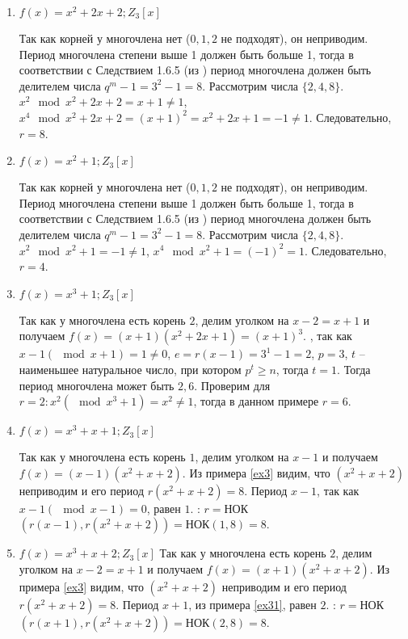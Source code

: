 \documentclass[utf8x, 14pt]{G7-32} %
\begin{document}
\begin{enumerate}
    \item $f(x)=x^2+2x+2; Z_3[x]$
    
    Так как корней у многочлена нет ($0,1,2$ не подходят), он неприводим. Период многочлена степени выше 1 должен быть больше 1, тогда в соответствии с Следствием 1.6.5 (из \cite{hse:Teoria_Gener}) период многочлена должен быть делителем числа $q^m -1 = 3^2 -1 = 8$. Рассмотрим числа $\{2, 4, 8\}$. $x^2 \mod x^2 + 2x +2 = x +1 \neq 1$,  $x^4 \mod x^2 + 2x +2 = (x +1)^2 = x^2 + 2x + 1 = - 1 \neq 1$. Следовательно, $r=8$.

    \item $f(x)=x^2+1; Z_3[x]$
    
    Так как корней у многочлена нет ($0,1,2$ не подходят), он неприводим. Период многочлена степени выше 1 должен быть больше 1, тогда в соответствии с Следствием 1.6.5 (из \cite{hse:Teoria_Gener}) период многочлена должен быть делителем числа $q^m -1 = 3^2 -1 = 8$. Рассмотрим числа $\{2, 4, 8\}$. $x^2 \mod x^2 + 1 = -1 \neq 1$,  $x^4 \mod x^2 + 1 = (-1)^2 = 1$. Следовательно, $r=4$.

    \item $f(x)=x^3+1; Z_3[x]$
    
    Так как у многочлена есть корень $2$, делим уголком на $x-2 = x+1$ и получаем $f(x) = (x+1) (x^2 + 2x +1) = (x+1)^3$. , так как $x - 1 (\mod{x + 1}) = 1 \neq 0$, $e = r(x-1) = 3^1 - 1 = 2$, $p = 3$, $t$ – наименьшее натуральное число, при котором $p^t\geq n$, тогда $t = 1$. Тогда период многочлена может быть ${2, 6}$. Проверим для $r = 2: x^2 (\mod x^3 + 1) = x^2 \neq 1$, тогда в данном примере $r = 6$.

    \item $f(x)=x^3+x+1; Z_3[x]$
    
    Так как у многочлена есть корень $1$, делим уголком на $x-1$ и получаем $f(x) = (x-1) (x^2 + x +2)$. Из примера \ref{ex3} видим, что $(x^2 + x +2)$ неприводим и его период $r(x^2 + x +2) = 8$. Период $x -1$, так как $x -1 (\mod{x - 1}) = 0$, равен $1$. : $r =$НОК$(r(x-1), r(x^2 + x +2)) = $НОК$(1, 8) = 8$.
    

    \item $f(x)=x^3+x+2; Z_3[x]$
    Так как у многочлена есть корень $2$, делим уголком на $x-2 = x+1$ и получаем $f(x) = (x+1) (x^2 + x +2)$. Из примера \ref{ex3} видим, что $(x^2 + x +2)$ неприводим и его период $r(x^2 + x +2) = 8$. Период $x + 1$, из примера \ref{ex31}, равен $2$. : $r =$НОК$(r(x+1), r(x^2 + x +2)) = $НОК$(2, 8) = 8$.
    
\end{enumerate}
\end{document}
